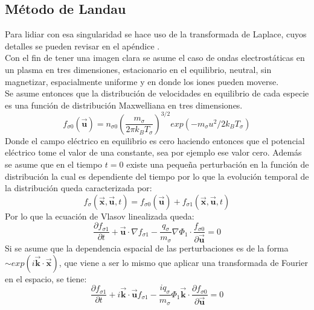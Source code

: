 \documentclass[../tesis_main_file.tex]{subfiles}
\begin{document}
\subsection*{Método de Landau}
Para lidiar con esa singularidad se hace uso de la transformada de Laplace, cuyos detalles se pueden revisar en el apéndice \notinsubfile{\ref{Ap:Laplace}}.\\
Con el fin de tener una imagen clara se asume el caso de ondas electrostáticas en un plasma en tres dimensiones, estacionario en el equilibrio, neutral, sin magnetizar, espacialmente uniforme y en donde los iones pueden moverse.\\
Se asume entonces que la distribución de velocidades en equilibrio de cada especie es una función de distribución Maxwelliana en tres dimensiones.
\begin{equation}
\label{eq:dist_max_3D}
f_{\sigma 0}(\overrightarrow{\textbf{u}})=n_{\sigma 0} \left(\frac{m_{\sigma}}{2\pi k_B T_{\sigma}}\right)^{3/2}exp(-m_{\sigma}u^2/2k_BT_{\sigma})
\end{equation}
Donde el campo eléctrico en equilibrio es cero haciendo entonces que el potencial eléctrico tome el valor de una constante, sea por ejemplo ese valor cero. Además se asume que en el tiempo $t=0$ existe una pequeña perturbación en la función de distribución la cual es dependiente del tiempo por lo que la evolución temporal de la distribución queda caracterizada por:
\begin{equation}
f_{\sigma}(\overrightarrow{\textbf{x}},\overrightarrow{\textbf{u}},t)=f_{\sigma 0}(\overrightarrow{\textbf{u}})+f_{\sigma 1}(\overrightarrow{\textbf{x}},\overrightarrow{\textbf{u}},t)
\end{equation}
Por lo que la ecuación de Vlasov linealizada queda:
\begin{equation}
\frac{\partial f_{\sigma 1}}{\partial t}+ \overrightarrow{\textbf{u}} \cdot \nabla f_{\sigma 1} -\frac{q_{\sigma}}{m_{\sigma}}\nabla \Phi _1 \cdot \frac{f_{\sigma 0}}{\partial  \overrightarrow{\textbf{u}}}=0
\end{equation}
Si se asume que la dependencia espacial de las perturbaciones es de la forma $\sim exp(i\overrightarrow{\textbf{k}}\cdot \overrightarrow{\textbf{x}})$, que viene a ser lo mismo que aplicar una transformada de Fourier en el espacio, se tiene:
\begin{equation}
\frac{\partial f_{\sigma 1}}{\partial t}+ i\overrightarrow{\textbf{k}}\cdot \overrightarrow{\textbf{u}}f_{\sigma 1}-\frac{i q_{\sigma}}{m_{\sigma}}\Phi _1 \overrightarrow{\textbf{k}}\cdot \frac{\partial f_{\sigma 0}}{\partial \overrightarrow{\textbf{u}}}=0
\end{equation}
\end{document}
